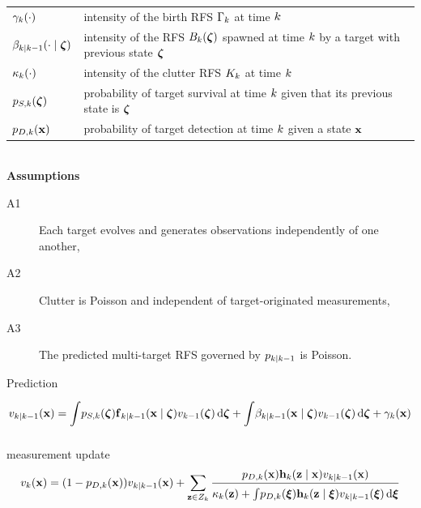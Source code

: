 \documentclass[a4paper,10pt]{scrreprt}
\theoremstyle{theorem}
\theoremstyle{definition}
\begin{document}
\begin{table}[h]
\centering
\begin{tabular}{@{} l l @{}}
	\toprule
	\( \gamma_k(\cdot) \)								& intensity of the birth RFS \( \Gamma_k \) at time \( k \) \\
	\( \beta_{\tind|\tind-1}(\cdot \mid \vb{\zeta}) \) 		& intensity of the RFS \( B_\tind(\vb{\zeta}) \) spawned at time \( k \) by a target with previous state \( \vb{\zeta} \) \\
	\( \kappa_k(\cdot) \)								& intensity of the clutter RFS \( K_k \) at time \( k \) \\
	\( p_{S,k}(\vb{\zeta}) \)								& probability of target survival at time \( k \) given that its previous state is \( \vb{\zeta} \) \\
	\( p_{D,k}(\inVar) \)									& probability of target detection at time \( k \) given a state \( \inVar \) \\
	\bottomrule
\end{tabular}
\end{table}

\ \\
\textbf{Assumptions}\\
\begin{description}
	\item[A1] Each target evolves and generates observations independently of one another,
	\item[A2] Clutter is Poisson and independent of target-originated measurements,
	\item[A3] The predicted multi-target RFS governed by \( p_{k|k-1} \) is Poisson.
\end{description}


Prediction
\begin{equation}\label{eq:phd_filter_prediction}
	v_{\tind|\tind-1}(\inVar) 
	= \integ p_{S,\tind}(\vb{\zeta}) \stFcn_{\tind|\tind-1}(\inVar \mid \vb{\zeta}) v_{\tind-1}(\vb{\zeta}) \dx[\vb{\zeta}]
	+ \integ \beta_{\tind|\tind-1}(\inVar \mid \vb{\zeta}) v_{\tind-1}(\vb{\zeta}) \dx[\vb{\zeta}] + \gamma_\tind(\inVar)
\end{equation}

measurement update
\begin{equation}\label{eq:phd_filter_update}
	v_\tind(\inVar) = (1 - p_{D,\tind}(\inVar))v_{\tind|\tind-1}(\inVar) + \sum\limits_{\msVar \in \msSet_\tind} \frac{p_{D,\tind}(\inVar)\msFcn_\tind(\msVar \mid \inVar) v_{\tind|\tind-1}(\inVar)}{\kappa_\tind(\msVar) + \integ p_{D,\tind}(\inVarU) \msFcn_\tind(\msVar\mid\inVarU) v_{\tind|\tind-1}(\inVarU) \dx[\inVarU]} 
\end{equation}





\end{document}
